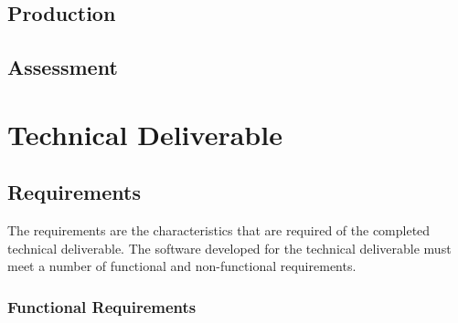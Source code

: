 \documentclass[conference,compsoc]{IEEEtran}
\begin{document}

\subsection{Production}











\subsection{Assessment}


\section{Technical Deliverable}
\label{sec-tech-production}
\subsection{Requirements}


The requirements are the characteristics that are required of the completed technical deliverable.
The software developed for the technical deliverable must meet a number of functional and non-functional requirements.

\subsubsection{Functional Requirements}
\end{document}

